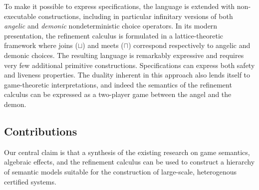 \documentclass[sigplan,10pt,review,anonymous]{acmart}
\begin{document}
To make it possible to express specifications,
the language is extended with non-executable constructions,
including in particular infinitary versions of both
\emph{angelic} and \emph{demonic} nondeterministic choice operators.
In its modern presentation,
the refinement calculus is formulated in a lattice-theoretic framework
where joins ($\sqcup$) and meets ($\sqcap$)
correspond respectively to angelic and demonic choices.
The resulting language is remarkably expressive
and requires very few additional primitive constructions.
Specifications can express both safety and liveness properties.
The duality inherent in this approach
also lends itself to game-theoretic interpretations,
and indeed the semantics of the refinement calculus
can be expressed as a two-player game between
the angel and the demon.
%
%
%

\subsection{Contributions} %

Our central claim is that a synthesis
of the existing research on
game semantics, algebraic effects, and the refinement calculus
can be used to construct a hierarchy of semantic models
suitable for the construction of large-scale, heterogenous certified systems.
\end{document}
